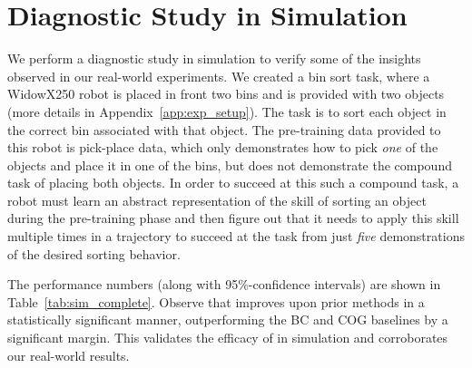 \documentclass[../thesis.tex]{subfiles}
\begin{document}
% 
% 
% 
% 
% 


\section{Diagnostic Study in Simulation}
\label{app:sim_diagnostic}

We perform a diagnostic study in simulation to verify some of the insights observed in our real-world experiments. We created a bin sort task, where a WidowX250 robot is placed in front two bins and is provided with two objects (more details in Appendix~\ref{app:exp_setup}). The task is to sort each object in the correct bin associated with that object. The pre-training data provided to this robot is pick-place data, which only demonstrates how to pick \emph{one} of the objects and place it in one of the bins, but does not demonstrate the compound task of placing both objects. In order to succeed at this such a compound task, a robot must learn an abstract representation of the skill of sorting an object during the pre-training phase and then figure out that it needs to apply this skill multiple times in a trajectory to succeed at the task from just \emph{five} demonstrations of the desired sorting behavior.

The performance numbers (along with 95\%-confidence intervals) are shown in Table~\ref{tab:sim_complete}. Observe that \ptrmethodname improves upon prior methods in a statistically significant manner, outperforming the BC and COG baselines by a significant margin. This validates the efficacy of \ptrmethodname in simulation and corroborates our real-world results. 
\end{document}
